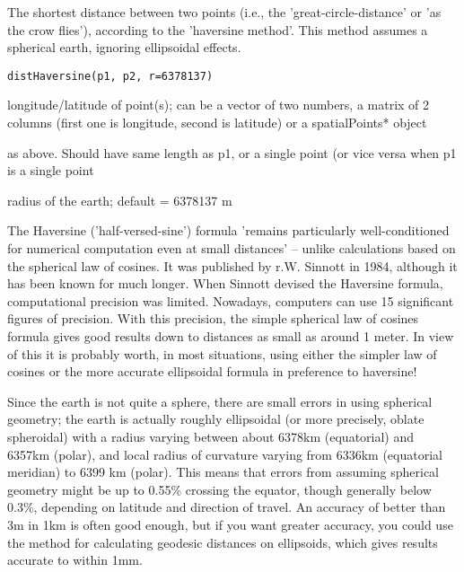 \begin{Description}\relax
The shortest distance between two points (i.e., the 'great-circle-distance' or 'as the crow flies'), according to the 'haversine method'.
This method assumes a spherical earth, ignoring ellipsoidal effects.
\end{Description}
\begin{Usage}
\begin{verbatim}distHaversine(p1, p2, r=6378137)
\end{verbatim}
\end{Usage}
\begin{Arguments}
\begin{ldescription}
\item[\code{p1}] longitude/latitude of point(s); can be a vector of two numbers, a matrix of 2 columns (first one is longitude, second is latitude) or a spatialPoints* object
\item[\code{p2}] as above. Should have same length as p1, or a single point (or vice versa when p1 is a single point
\item[\code{r}] radius of the earth; default = 6378137 m
\end{ldescription}
\end{Arguments}
\begin{Details}\relax
The Haversine ('half-versed-sine') formula 'remains particularly well-conditioned for numerical computation even at small distances' -- unlike calculations based on the spherical law of cosines. It was published by r.W. Sinnott in 1984, although it has been known  for much longer. When Sinnott devised the Haversine formula, computational precision was limited. Nowadays, computers can use 15 significant figures of precision. With this precision, the simple spherical law of cosines formula gives good results down to distances as small as around 1 meter. In view of this it is probably worth, in most situations, using either the simpler law of cosines or the more accurate ellipsoidal  formula in preference to haversine! 

Since the earth is not quite a sphere, there are small errors in using spherical geometry; the earth is actually roughly ellipsoidal (or more precisely, oblate spheroidal) with a radius varying between about 6378km (equatorial) and 6357km (polar), and local radius of curvature varying from 6336km (equatorial meridian) to 6399 km (polar). This means that errors from assuming spherical geometry might be up to 0.55\% crossing the equator, though generally below 0.3\%, depending on latitude and direction of travel. An accuracy of better than 3m in 1km is often good enough, but if you want greater accuracy, you could use the  method for calculating geodesic distances on ellipsoids, which gives results accurate to within 1mm.
\end{Details}
